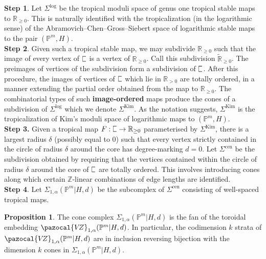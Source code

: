 \documentclass[11pt]{amsart}
\newcommand{\plC}{\scalebox{0.8}[1.3]{$\sqsubset$}}
\newcommand{\Kim}{\operatorname{Kim}}
\newcommand{\PP}{\mathbb P}
\newcommand{\Z}{\mathbb{Z}}
\newcommand{\VZ}{\pazocal{V\!Z}}
\renewcommand{\to}{\rightarrow}
\newcommand{\RR}{\mathbb{R}}
\theoremstyle{definition}
\newtheorem{prop}[thm]{Proposition}
\theoremstyle{definition}
\begin{document}
\noindent
\textbf{Step 1}. Let $\Sigma^{\mathrm{log}}$ be the tropical moduli space of genus one tropical stable maps to $\mathbb R_{\geq 0}$. This is naturally identified with the tropicalization (in the logarithmic sense) of the Abramovich--Chen--Gross--Siebert space of logarithmic stable maps to the pair $(\mathbb P^m,H)$. \\

\noindent
\textbf{Step 2}. Given such a tropical stable map, we may subdivide $\mathbb R_{\geq 0}$ such that the image of every vertex of $\plC$ is a vertex of $\mathbb R_{\geq 0}$. Call this subdivision $\widetilde{\mathbb R}_{\geq 0}$. The preimages of vertices of the subdivision form a subdivision of $\plC$. After this procedure, the images of vertices of $\plC$ which lie in $\RR_{>0}$ are totally ordered, in a manner extending the partial order obtained from the map to $\mathbb R_{\geq 0}$. The combinatorial types of such \textbf{image-ordered} maps produce the cones of a subdivision of $\Sigma^{\mathrm{log}}$ which we denote $\Sigma^{\mathrm{Kim}}$. As the notation suggests, $\Sigma^{\Kim}$ is the tropicalization of Kim's moduli space of logarithmic maps to $(\PP^m,H)$.\\

\noindent
\textbf{Step 3.} Given a tropical map $F: \plC\to \mathbb R_{\geq 0}$ parameterised by $\Sigma^{\mathrm{Kim}}$, there is a largest radius $\delta$ (possibly equal to $0$) such that every vertex strictly contained in the circle of radius $\delta$ around the core has degree-marking $d=0$. Let $
\Sigma^{\mathrm{cen}}$ be the subdivision obtained by requiring that the vertices contained within the circle of radius $\delta$ around the core of $\plC$ are totally ordered. This involves introducing cones along which certain $\Z$-linear combinations of edge lengths are identified.\\

\noindent
\textbf{Step 4}. Let $\Sigma_{1,\alpha}(\mathbb P^m|H,d)$ be the subcomplex of $\Sigma^{\mathrm{cen}}$ consisting of well-spaced tropical maps.

\begin{prop}
The cone complex $
\Sigma_{1,\alpha}(\mathbb P^m|H,d)$ is the fan of the toroidal embedding $
\VZ_{1,\alpha}(\mathbb P^m|H,d)$. In particular, the codimension $k$ strata of $
\VZ_{1,\alpha}(\mathbb P^m|H,d)$ are in inclusion reversing bijection with the dimension $k$ cones in $
\Sigma_{1,\alpha}(\mathbb P^m|H,d)$.
\end{prop}
\end{document}

